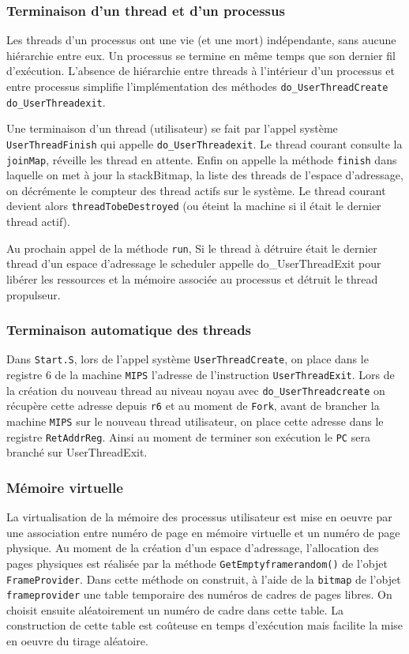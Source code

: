 \documentclass[11pt]{article}
\theoremstyle{definition}
\theoremstyle{definition}
\begin{document}
\subsubsection{Terminaison d'un thread et d'un processus}
Les threads d'un processus ont une vie (et une mort) indépendante, sans aucune hiérarchie entre eux.
Un processus se termine en même temps que son dernier fil d'exécution.
L'absence de hiérarchie entre threads à l'intérieur d'un processus et entre processus simplifie
l'implémentation des méthodes \texttt{do\_UserThreadCreate} \texttt{do\_UserThreadexit}.

Une terminaison d'un thread (utilisateur) se fait par l'appel système \texttt{UserThreadFinish} qui appelle \texttt{do\_UserThreadexit}. Le thread courant consulte la \texttt{joinMap}, réveille les thread en attente. Enfin on appelle la méthode \texttt{finish} dans laquelle on met à jour la stackBitmap, la liste des threads de l'espace d'adressage, on décrémente le compteur des thread actifs sur le système. Le thread courant devient alors \texttt{threadTobeDestroyed} (ou éteint la machine si il était le dernier thread actif).

Au prochain appel de la méthode \texttt{run}, Si le thread à détruire était le dernier thread d'un espace d'adressage le scheduler appelle do\_UserThreadExit pour libérer les ressources et la mémoire associée au processus et détruit le thread propulseur.

\subsubsection{Terminaison automatique des threads}
Dans \texttt{Start.S}, lors de l'appel système \texttt{UserThreadCreate}, on place dans le registre $6$ de la machine \texttt{MIPS} l'adresse de l'instruction \texttt{UserThreadExit}.
Lors de la création du nouveau thread au niveau noyau avec \texttt{do\_UserThreadcreate} on récupère
cette adresse depuis \texttt{r6} et au moment de \texttt{Fork}, avant de brancher la machine \texttt{MIPS} sur
le nouveau thread utilisateur, on place cette adresse dans le registre \texttt{RetAddrReg}. Ainsi au moment de terminer son exécution le \texttt{PC} sera branché sur UserThreadExit.

\subsubsection{Mémoire virtuelle}
La virtualisation de la mémoire des processus utilisateur est mise en oeuvre par une association entre numéro
de page en mémoire virtuelle et un numéro de page physique. Au moment de la création d'un espace d'adressage, l'allocation des pages physiques est réalisée par la méthode \texttt{GetEmptyframerandom()} de l'objet \texttt{FrameProvider}.
Dans cette méthode on construit, à l'aide de la \texttt{bitmap} de l'objet \texttt{frameprovider} une table temporaire des numéros de cadres de pages libres.
On choisit ensuite aléatoirement un numéro de cadre dans cette table. La construction de cette table est coûteuse en temps d'exécution mais facilite la mise en oeuvre du tirage aléatoire.
\end{document}
